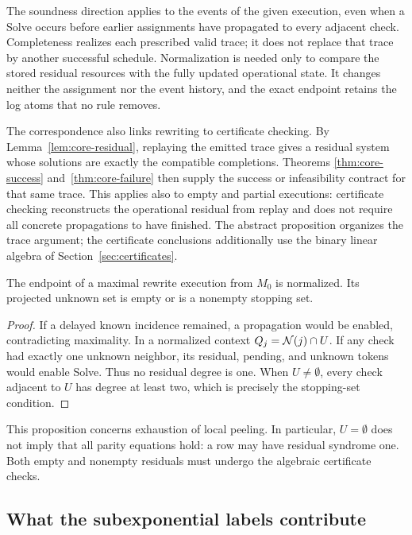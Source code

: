 The soundness direction applies to the events of the given execution, even
when a Solve occurs before earlier assignments have propagated to every
adjacent check. Completeness realizes each prescribed valid trace; it does
not replace that trace by another successful schedule. Normalization is
needed only to compare the stored residual resources with the fully updated
operational state. It changes neither the assignment nor the event history,
and the exact endpoint retains the log atoms that no rule removes.

The correspondence also links rewriting to certificate checking.
By Lemma~\ref{lem:core-residual}, replaying the emitted trace gives a residual
system whose solutions are exactly the compatible completions. Theorems
\ref{thm:core-success} and~\ref{thm:core-failure} then supply the success or
infeasibility contract for that same trace. This applies also to empty and
partial executions: certificate checking reconstructs the operational
residual from replay and does not require all concrete propagations to have
finished. The abstract proposition organizes the trace argument; the
certificate conclusions additionally use the binary linear algebra of
Section~\ref{sec:certificates}.

\begin{prop}
\label{prop:sem-stopping}
The endpoint of a maximal rewrite execution from $M_0$ is normalized.
Its projected unknown set is empty or is a nonempty stopping set.
\end{prop}
\begin{proof}
If a delayed known incidence remained, a propagation would be enabled,
contradicting maximality. In a normalized context $Q_j=\mathcal{N}(j)\cap U$.
If any check had exactly one unknown neighbor, its residual, pending, and
unknown tokens would enable Solve. Thus no residual degree is one.
When $U\neq\emptyset$, every check adjacent to $U$ has degree at least two,
which is precisely the stopping-set condition.
\end{proof}

This proposition concerns exhaustion of local peeling. In particular,
$U=\emptyset$ does not imply that all parity equations hold: a row may have
residual syndrome one. Both empty and nonempty residuals must undergo the
algebraic certificate checks.

\subsection{What the subexponential labels contribute}
\label{sec:sem-sell-role}

